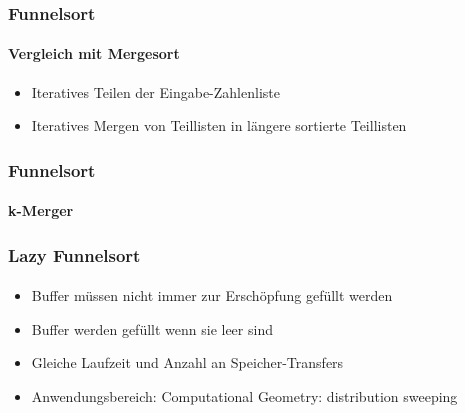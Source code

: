 \documentclass{beamer}
\begin{document}
\begin{frame}
  \frametitle{Funnelsort}
  \framesubtitle{Vergleich mit Mergesort}
  \begin{itemize}
    \item Iteratives Teilen der Eingabe-Zahlenliste
    \item Iteratives Mergen von Teillisten
      in längere sortierte Teillisten
  \end{itemize}
\end{frame}

\begin{frame}
  \frametitle{Funnelsort}
  \framesubtitle{k-Merger}
  \begin{itemize}
  \end{itemize}
\end{frame}

\begin{frame}
  \frametitle{Lazy Funnelsort}
  \framesubtitle{}
  \begin{itemize}
    \item Buffer müssen nicht immer zur Erschöpfung gefüllt werden
    \item Buffer werden gefüllt wenn sie leer sind
    \item Gleiche Laufzeit und Anzahl an Speicher-Transfers
    \item Anwendungsbereich: Computational Geometry: distribution sweeping
  \end{itemize}
\end{frame}
\end{document}
